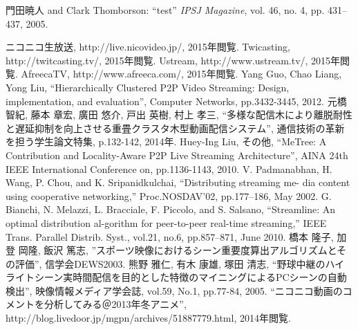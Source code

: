 %
%
\begin{thebibliography}{99}

門田暁人 and Clark Thomborson:
``test''
{\it IPSJ Magazine}, vol. 46, no. 4, pp. 431--437, 2005.

  ニコニコ生放送, http://live.nicovideo.jp/, 2015年閲覧.
  Twicasting, http://twitcasting.tv/, 2015年閲覧.
  Ustream, http://www.ustream.tv/, 2015年閲覧.
  AfreecaTV, http://www.afreeca.com/, 2015年閲覧.
  Yang Guo, Chao Liang, Yong Liu, “Hierarchically Clustered P2P Video Streaming: Design, implementation, and evaluation”, Computer Networks, pp.3432-3445, 2012.
  元橋 智紀, 藤本 章宏, 廣田 悠介, 戸出 英樹, 村上 孝三, “多様な配信木により離脱耐性と遅延抑制を向上させる重畳クラスタ木型動画配信システム”, 通信技術の革新を担う学生論文特集, p.132-142, 2014年.
  Huey-Ing Liu, その他, “MeTree: A Contribution and Locality-Aware P2P Live Streaming Architecture”, AINA 24th IEEE International Conference on, pp.1136-1143, 2010.
  V. Padmanabhan, H. Wang, P. Chou, and K. Sripanidkulchai, “Distributing streaming me-
dia content using cooperative networking,” Proc.NOSDAV’02, pp.177–186, May 2002.
  G. Bianchi, N. Melazzi, L. Bracciale, F. Piccolo, and S. Salsano, “Streamline: An optimal distribution al-gorithm for peer-to-peer real-time streaming,” IEEE Trans. Parallel Distrib. Syst., vol.21, no.6, pp.857–871, June 2010.
  橋本 隆子, 加登 岡隆, 飯沢 篤志, ”スポーツ映像におけるシーン重要度算出アルゴリズムとその評価”, 信学会DEWS2003.
  熊野 雅仁, 有木 康雄, 塚田 清志, “野球中継のハイライトシーン実時間配信を目的とした特徴のマイニングによるPCシーンの自動検出”, 映像情報メディア学会誌, vol.59, No.1, pp.77-84, 2005.
  “ニコニコ動画のコメントを分析してみる＠2013年冬アニメ”, http://blog.livedoor.jp/mgpn/archives/51887779.html, 2014年閲覧.

\end{thebibliography}
